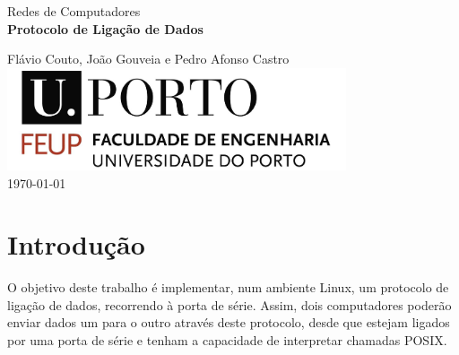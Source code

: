 \documentclass[11pt,a4paper,reqno]{article}
\numberwithin{equation}{section}
\begin{document}
\begin{titlepage}
\begin{center}
 
\vspace*{3cm}

{\Large Redes de Computadores}\\[2cm]

{\Huge \bfseries Protocolo de Liga\c{c}\~ao de Dados \\[1cm]}

{\large Flávio Couto, João Gouveia e Pedro Afonso Castro}\\[2cm]

\includegraphics[width=10cm]{feup_logo.jpg}\\[2cm]


{\large \today}

\end{center}
\end{titlepage}

\begin{abstract}
No âmbito da unidade curricular de Redes de Computadores, foi-nos proposta a elaboração de uma aplicação que permitia a transferência de dados entre dois computadores através da porta de série. Para tal, recorremos à implementação de duas camadas: a camada de ligação de dados e a camada da aplicação.

O nosso grupo soube compreender bem os objetivos propostos, tendo implementado com sucesso não só estes mesmos objetivos, como alguns elementos de valorização propostos pelos docentes, servindo este relatório para mostrar isso mesmo.
\end{abstract}

\tableofcontents

\section{Introdução}

O objetivo deste trabalho é implementar, num ambiente Linux, um protocolo de ligação de dados, recorrendo à porta de série. Assim, dois computadores poderão enviar dados um para o outro através deste protocolo, desde que estejam ligados por uma porta de série e tenham a capacidade de interpretar chamadas POSIX.
\end{document}
